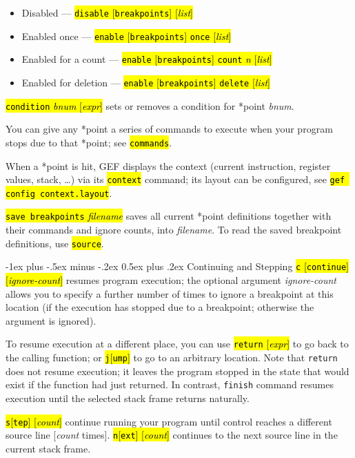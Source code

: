 \documentclass[a4paper,landscape]{article}
\makeatletter
\newcommand{\hlc}[2][yellow]{{\sethlcolor{#1} \hl{#2}}}
\newcommand{\gef}[1]{\hlc[skyblue]{#1}}
\renewcommand{\section}{\@startsection{section}{1}{0mm}%
                                {-1ex plus -.5ex minus -.2ex}%
                                {0.5ex plus .2ex}%
                                {\normalfont\large\bfseries}}
\makeatother
\begin{document}
\begin{multicols*}{3}
\begin{itemize}
\item Disabled --- \hl{\texttt{disable} [\texttt{breakpoints}] [\textit{list}]}
\item Enabled once --- \hl{\texttt{enable} [\texttt{breakpoints}] \texttt{once} [\textit{list}]}
\item Enabled for a count --- \hl{\texttt{enable} [\texttt{breakpoints}] \texttt{count} \textit{n} [\textit{list}]}
\item Enabled for deletion --- \hl{\texttt{enable} [\texttt{breakpoints}] \texttt{delete} [\textit{list}]}
\end{itemize}
\hl{\texttt{condition} \textit{bnum} [\textit{expr}]} sets or removes a condition for *point \textit{bnum}.

You can give any *point a series of commands to execute
when your program stops due to that *point; see \hl{\texttt{commands}}.

When a *point is hit, GEF displays the context (current instruction, register values, stack, \ldots) via its
\gef{\texttt{context}} command; its layout can be configured, see
\gef{\texttt{gef config context.layout}}.

\hl{\texttt{save breakpoints} \textit{filename}} saves all current *point definitions together with their commands and ignore counts, into \textit{filename}.
To read the saved breakpoint definitions, use \hl{\texttt{source}}.

\section{Continuing and Stepping}
\hl{\texttt{c} [\texttt{continue}] [\textit{ignore-count}]}
resumes program execution; the optional argument
\textit{ignore-count} allows you to specify a further number of times to ignore a breakpoint at this location (if the execution has stopped due to a breakpoint; otherwise the argument is ignored).

To resume execution at a different place, you can use \hl{\texttt{return} [\textit{expr}]} to go back to the
calling function; or \hl{\texttt{j}[\texttt{ump}]} to go to an arbitrary location.
Note that \texttt{return} does not resume execution; it leaves the program stopped in the
state that would exist if the function had just returned. In contrast, \texttt{finish} command
resumes execution until the selected stack frame returns naturally.

\hl{\texttt{s}[\texttt{tep}] [\textit{count}]} continue running your program until control reaches a different source line [\textit{count} times]. \hl{\texttt{n}[\texttt{ext}] [\textit{count}]} continues to the next source line in the current stack frame.


\end{multicols*}
\end{document}
